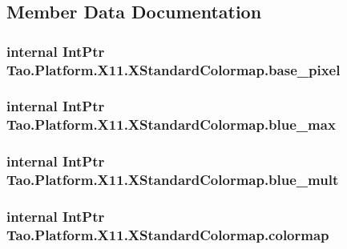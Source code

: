 \subsection{Member Data Documentation}
\hypertarget{struct_tao_1_1_platform_1_1_x11_1_1_x_standard_colormap_a476a79bcf4e6d7580c2ad29d2c92dea3}{
\subsubsection[{base\_\-pixel}]{\setlength{\rightskip}{0pt plus 5cm}internal IntPtr {\bf Tao.Platform.X11.XStandardColormap.base\_\-pixel}}}
\label{struct_tao_1_1_platform_1_1_x11_1_1_x_standard_colormap_a476a79bcf4e6d7580c2ad29d2c92dea3}
\hypertarget{struct_tao_1_1_platform_1_1_x11_1_1_x_standard_colormap_a4d1d316a7caaad430396b318e8c1120c}{
\subsubsection[{blue\_\-max}]{\setlength{\rightskip}{0pt plus 5cm}internal IntPtr {\bf Tao.Platform.X11.XStandardColormap.blue\_\-max}}}
\label{struct_tao_1_1_platform_1_1_x11_1_1_x_standard_colormap_a4d1d316a7caaad430396b318e8c1120c}
\hypertarget{struct_tao_1_1_platform_1_1_x11_1_1_x_standard_colormap_ad5673bf69199006ecc3b84de42aac996}{
\subsubsection[{blue\_\-mult}]{\setlength{\rightskip}{0pt plus 5cm}internal IntPtr {\bf Tao.Platform.X11.XStandardColormap.blue\_\-mult}}}
\label{struct_tao_1_1_platform_1_1_x11_1_1_x_standard_colormap_ad5673bf69199006ecc3b84de42aac996}
\hypertarget{struct_tao_1_1_platform_1_1_x11_1_1_x_standard_colormap_ab49dd3711c62dfb1506e938f108a6aa4}{
\subsubsection[{colormap}]{\setlength{\rightskip}{0pt plus 5cm}internal IntPtr {\bf Tao.Platform.X11.XStandardColormap.colormap}}}
